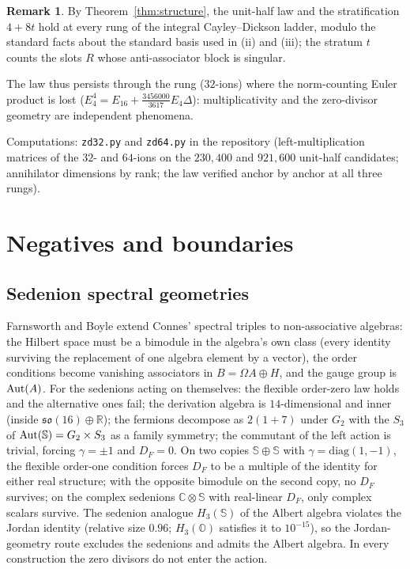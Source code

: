 \documentclass[11pt]{amsart}
\theoremstyle{definition}
\newtheorem{remark}[theorem]{Remark}
\renewcommand{\O}{\mathbb{O}}\newcommand{\Sd}{\mathbb{S}}\newcommand{\Hq}{\mathbb{H}}\newcommand{\Z}{\mathbb{Z}}\newcommand{\Q}{\mathbb{Q}}\newcommand{\R}{\mathbb{R}}\newcommand{\C}{\mathbb{C}}\newcommand{\F}{\mathbb{F}}
\begin{document}
\begin{remark}
By Theorem~\ref{thm:structure}, the unit-half law and the stratification $4+8t$ hold at every rung of the integral Cayley--Dickson ladder, modulo the standard facts about the standard basis used in (ii) and (iii); the stratum $t$ counts the slots $R$ whose anti-associator block is singular.
\end{remark}
The law thus persists through the rung ($32$-ions) where the norm-counting Euler product is lost ($E_4^4=E_{16}+\tfrac{3456000}{3617}E_4\Delta$): multiplicativity and the zero-divisor geometry are independent phenomena.

Computations: \texttt{zd32.py} and \texttt{zd64.py} in the repository (left-multiplication matrices of the $32$- and $64$-ions on the $230{,}400$ and $921{,}600$ unit-half candidates; annihilator dimensions by rank; the law verified anchor by anchor at all three rungs).

\section{Negatives and boundaries}\label{sec:negatives}
\subsection{Sedenion spectral geometries}
Farnsworth and Boyle \cite{FB13,BF14} extend Connes' spectral triples to non-associative algebras: the Hilbert space must be a bimodule in the algebra's own class (every identity surviving the replacement of one algebra element by a vector), the order conditions become vanishing associators in $B=\Omega A\oplus H$, and the gauge group is $\operatorname{Aut}(A)$. For the sedenions acting on themselves: the flexible order-zero law holds and the alternative ones fail; the derivation algebra is $14$-dimensional and inner (inside $\mathfrak{so}(16)\oplus\R$); the fermions decompose as $2(1+7)$ under $G_2$ with the $S_3$ of $\Aut(\Sd)=G_2\times S_3$ as a family symmetry; the commutant of the left action is trivial, forcing $\gamma=\pm 1$ and $D_F=0$. On two copies $\Sd\oplus\Sd$ with $\gamma=\mathrm{diag}(1,-1)$, the flexible order-one condition forces $D_F$ to be a multiple of the identity for either real structure; with the opposite bimodule on the second copy, no $D_F$ survives; on the complex sedenions $\C\otimes\Sd$ with real-linear $D_F$, only complex scalars survive. The sedenion analogue $H_3(\Sd)$ of the Albert algebra violates the Jordan identity (relative size $0.96$; $H_3(\O)$ satisfies it to $10^{-15}$), so the Jordan-geometry route \cite{BF14} excludes the sedenions and admits the Albert algebra. In every construction the zero divisors do not enter the action.
\end{document}
